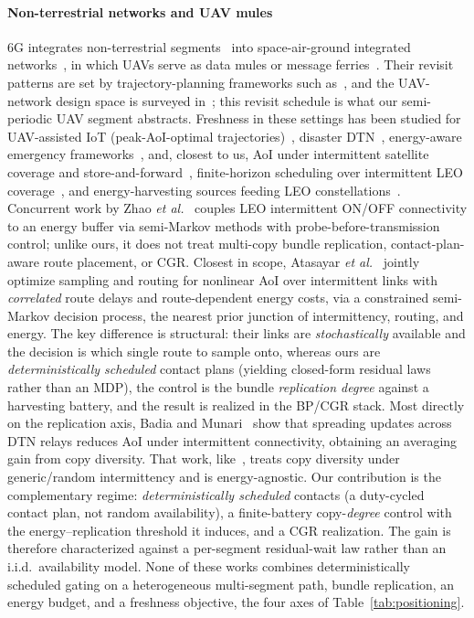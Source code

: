 \documentclass[twocolumn,3p,times,procedia]{elsarticle}
\theoremstyle{plain}
\theoremstyle{remark}
\begin{document}
\paragraph*{Non-terrestrial networks and UAV mules}
6G integrates non-terrestrial segments~\cite{azari2022,giordani2021} into
space-air-ground integrated networks~\cite{liu2018sagin}, in which UAVs
serve as data mules or message
ferries~\cite{zhao2004ferry,shah2003mules}. Their revisit patterns are
set by trajectory-planning frameworks such as~\cite{huang2025uav}, and
the UAV-network design space is surveyed in~\cite{zhou2026uavai}; this
revisit schedule is what our semi-periodic UAV segment abstracts.
Freshness in these settings has been studied for UAV-assisted IoT
(peak-AoI-optimal trajectories)~\cite{abdelmagid2019}, disaster
DTN~\cite{isayama}, energy-aware emergency frameworks~\cite{e3f}, and,
closest to us, AoI under intermittent satellite coverage and
store-and-forward~\cite{ari},
finite-horizon scheduling over intermittent LEO coverage~\cite{badia2025},
and energy-harvesting sources feeding LEO constellations~\cite{delfani2025}.
Concurrent work by Zhao \emph{et al.}~\cite{zhao2026aoi} couples LEO
intermittent ON/OFF connectivity to an energy buffer via semi-Markov
methods with probe-before-transmission control; unlike ours, it does
not treat multi-copy bundle replication, contact-plan-aware route
placement, or CGR. Closest in scope, Atasayar
\emph{et al.}~\cite{atasayar2025} jointly
optimize sampling and routing for nonlinear AoI over intermittent links
with \emph{correlated} route delays and route-dependent energy costs,
via a constrained semi-Markov decision process, the nearest prior
junction of intermittency, routing, and energy. The key difference is
structural: their links are \emph{stochastically} available and the
decision is which single route to sample onto, whereas ours are
\emph{deterministically scheduled} contact plans (yielding closed-form
residual laws rather than an MDP), the control is the bundle
\emph{replication degree} against a harvesting battery, and the result
is realized in the BP/CGR stack. Most directly on the replication axis,
Badia and Munari~\cite{badia2025globecom} show that
spreading updates across DTN relays reduces AoI under intermittent
connectivity, obtaining an averaging gain from copy diversity. That work,
like~\cite{kam2016}, treats copy diversity under generic/random
intermittency and is energy-agnostic. Our contribution is the
complementary regime: \emph{deterministically scheduled} contacts (a
duty-cycled contact plan, not random availability), a finite-battery
copy-\emph{degree} control with the energy--replication threshold it
induces, and a CGR realization. The gain is therefore characterized
against a per-segment residual-wait law rather than an i.i.d.\
availability model. None of these works combines deterministically
scheduled gating on a heterogeneous multi-segment path, bundle
replication, an energy budget, and a freshness objective, the four axes
of Table~\ref{tab:positioning}.
\end{document}
